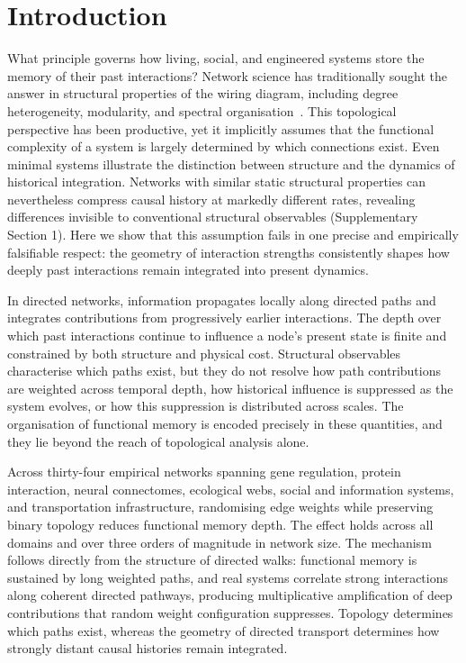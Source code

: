 \documentclass[aps,superscriptaddress,11pt]{revtex4-2}
\theoremstyle{definition}
\theoremstyle{plain}
\begin{document}
\section{Introduction}
What principle governs how living, social, and engineered systems store the
memory of their past interactions? Network science has traditionally sought
the answer in structural properties of the wiring diagram, including degree
heterogeneity, modularity, and spectral
organisation~\cite{Simon1991,Newman2003,Bianconi2023}. This topological
perspective has been productive, yet it implicitly assumes that the functional
complexity of a system is largely determined by which connections exist. Even minimal 
systems illustrate the distinction between structure and the
dynamics of historical integration. Networks with similar static structural
properties can nevertheless compress causal history at markedly different
rates, revealing differences invisible to conventional structural
observables (Supplementary Section 1). Here we show that this assumption fails in one precise 
and empirically falsifiable respect: the geometry of interaction strengths consistently
shapes how deeply past interactions remain integrated into present dynamics.

In directed networks, information propagates locally along directed paths
and integrates contributions from progressively earlier interactions. The depth over 
which past interactions continue to influence a node's present state is finite and 
constrained by both structure and physical cost.
Structural observables characterise which paths exist, but they do not resolve
how path contributions are weighted across temporal depth, how historical
influence is suppressed as the system evolves, or how this suppression is
distributed across scales. The organisation of functional memory is 
encoded precisely in these quantities, and they lie beyond the reach of topological
analysis alone.

Across thirty-four empirical networks spanning gene regulation, protein
interaction, neural connectomes, ecological webs, social and information
systems, and transportation infrastructure, randomising edge weights while
preserving binary topology reduces functional memory depth. The effect
holds across all domains and over three orders of magnitude in network
size. The mechanism follows directly from the structure of directed walks:
functional memory is sustained by long weighted paths, and real systems
correlate strong interactions along coherent directed pathways, producing
multiplicative amplification of deep contributions that random weight
configuration suppresses. Topology determines which paths exist, whereas
the geometry of directed transport determines how strongly distant causal
histories remain integrated.
\end{document}
